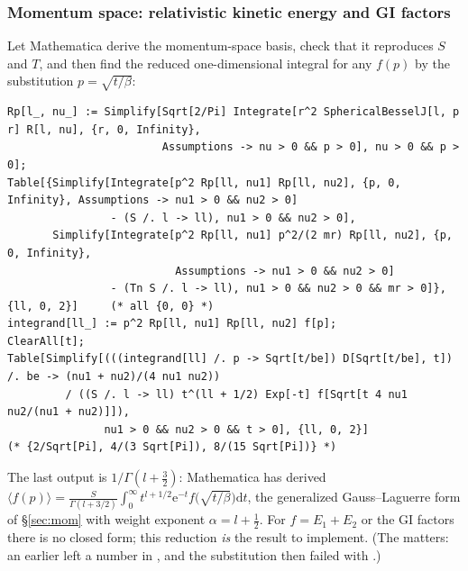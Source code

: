 \documentclass[11pt,a4paper]{article}
\numberwithin{equation}{section}
\theoremstyle{definition}
\theoremstyle{plain}
\theoremstyle{remark}
\numberwithin{algorithm}{section}
\newcommand{\dd}{\mathrm{d}}
\newcommand{\ee}{\mathrm{e}}
\begin{document}
\subsubsection{Momentum space: relativistic kinetic energy and GI factors}
Let Mathematica derive the momentum-space basis, check that it reproduces $S$ and $T$, and then find the reduced one-dimensional integral for any $f(p)$ by the substitution $p=\sqrt{t/\beta}$:
\begin{lstlisting}[style=wl]
Rp[l_, nu_] := Simplify[Sqrt[2/Pi] Integrate[r^2 SphericalBesselJ[l, p r] R[l, nu], {r, 0, Infinity},
                        Assumptions -> nu > 0 && p > 0], nu > 0 && p > 0];
Table[{Simplify[Integrate[p^2 Rp[ll, nu1] Rp[ll, nu2], {p, 0, Infinity}, Assumptions -> nu1 > 0 && nu2 > 0]
                - (S /. l -> ll), nu1 > 0 && nu2 > 0],
       Simplify[Integrate[p^2 Rp[ll, nu1] p^2/(2 mr) Rp[ll, nu2], {p, 0, Infinity},
                          Assumptions -> nu1 > 0 && nu2 > 0]
                - (Tn S /. l -> ll), nu1 > 0 && nu2 > 0 && mr > 0]}, {ll, 0, 2}]     (* all {0, 0} *)
integrand[ll_] := p^2 Rp[ll, nu1] Rp[ll, nu2] f[p];
ClearAll[t];
Table[Simplify[(((integrand[ll] /. p -> Sqrt[t/be]) D[Sqrt[t/be], t]) /. be -> (nu1 + nu2)/(4 nu1 nu2))
         / ((S /. l -> ll) t^(ll + 1/2) Exp[-t] f[Sqrt[t 4 nu1 nu2/(nu1 + nu2)]]),
               nu1 > 0 && nu2 > 0 && t > 0], {ll, 0, 2}]                                      (* {2/Sqrt[Pi], 4/(3 Sqrt[Pi]), 8/(15 Sqrt[Pi])} *)
\end{lstlisting}
The last output is $1/\Gamma(l+\frac32)$: Mathematica has derived $\langle f(p)\rangle=\frac{S}{\Gamma(l+3/2)}\int_0^\infty t^{l+1/2}\ee^{-t}f\big(\sqrt{t/\beta}\big)\dd t$, the generalized Gauss--Laguerre form of \S\ref{sec:mom} with weight exponent $\alpha=l+\frac12$. For $f=E_1+E_2$ or the GI factors there is no closed form; this reduction \emph{is} the result to implement. (The  matters: an earlier  left a number in , and the substitution then failed with .)
\end{document}
